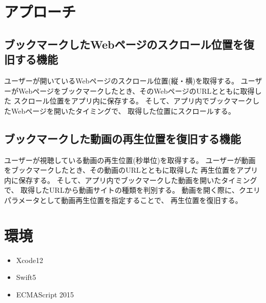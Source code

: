 \documentclass[a4j,10pt]{jsarticle}
\begin{document}
\begin{table}[t]
    \caption{}
    \label{table1}
    \begin{center}
    \end{center}
\end{table}

\section{アプローチ}
\subsection{ブックマークしたWebページのスクロール位置を復旧する機能}
ユーザーが開いているWebページのスクロール位置(縦・横)を取得する。
ユーザーがWebページをブックマークしたとき、そのWebページのURLとともに取得した
スクロール位置をアプリ内に保存する。
そして、アプリ内でブックマークしたWebページを開いたタイミングで、
取得した位置にスクロールする。

\subsection{ブックマークした動画の再生位置を復旧する機能}
ユーザーが視聴している動画の再生位置(秒単位)を取得する。
ユーザーが動画をブックマークしたとき、その動画のURLとともに取得した
再生位置をアプリ内に保存する。
そして、アプリ内でブックマークした動画を開いたタイミングで、
取得したURLから動画サイトの種類を判別する。
動画を開く際に、クエリパラメータとして動画再生位置を指定することで、
再生位置を復旧する。

\section{環境}
\begin{itemize}
\item Xcode12
\item Swift5
\item ECMAScript 2015
\end{itemize}
\end{document}
